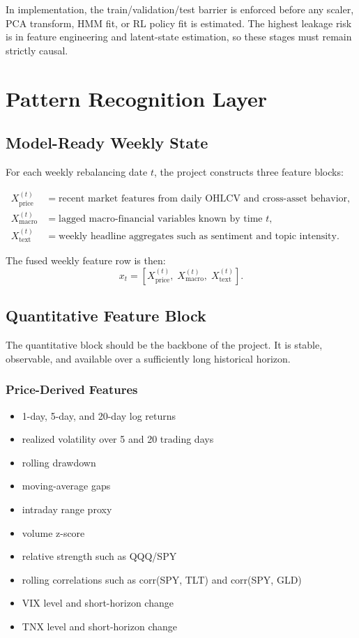 \documentclass[11pt,a4paper]{article}
\begin{document}
In implementation, the train/validation/test barrier is enforced before any scaler, PCA transform, HMM fit, or RL policy fit is estimated. The highest leakage risk is in feature engineering and latent-state estimation, so these stages must remain strictly causal.

\section{Pattern Recognition Layer}

\subsection{Model-Ready Weekly State}

For each weekly rebalancing date $t$, the project constructs three feature blocks:

\begin{align*}
X_{\text{price}}^{(t)} &= \text{recent market features from daily OHLCV and cross-asset behavior}, \\
X_{\text{macro}}^{(t)} &= \text{lagged macro-financial variables known by time } t, \\
X_{\text{text}}^{(t)} &= \text{weekly headline aggregates such as sentiment and topic intensity}.
\end{align*}

The fused weekly feature row is then:
\[
x_t = \left[X_{\text{price}}^{(t)},\; X_{\text{macro}}^{(t)},\; X_{\text{text}}^{(t)}\right].
\]

\subsection{Quantitative Feature Block}

The quantitative block should be the backbone of the project.
It is stable, observable, and available over a sufficiently long historical horizon.

\subsubsection{Price-Derived Features}

\begin{itemize}[leftmargin=1.4em]
  \item 1-day, 5-day, and 20-day log returns
  \item realized volatility over 5 and 20 trading days
  \item rolling drawdown
  \item moving-average gaps
  \item intraday range proxy
  \item volume z-score
  \item relative strength such as QQQ/SPY
  \item rolling correlations such as corr(SPY, TLT) and corr(SPY, GLD)
  \item VIX level and short-horizon change
  \item TNX level and short-horizon change
\end{itemize}
\end{document}
